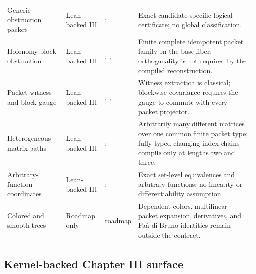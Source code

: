 \begin{longtable}{L{0.17\textwidth}L{0.18\textwidth}L{0.25\textwidth}L{0.22\textwidth}}
\addlinespace
Generic obstruction packet
& Lean-backed III
& ; 
& Exact candidate-specific logical certificate; no global classification.\\
\addlinespace
Holonomy block obstruction
& Lean-backed III
& ; ; 
& Finite complete idempotent packet family on the base fiber; orthogonality is not required by the compiled reconstruction.\\
\addlinespace
Packet witness and block gauge
& Lean-backed III
& ; ; 
& Witness extraction is classical; blockwise covariance requires the gauge to commute with every packet projector.\\
\addlinespace
Heterogeneous matrix paths
& Lean-backed III
& ; 
& Arbitrarily many different matrices over one common finite packet type; fully typed changing-index chains compile only at lengths two and three.\\
\addlinespace
Arbitrary-function coordinates
& Lean-backed III
& ; 
& Exact set-level equivalences and arbitrary functions; no linearity or differentiability assumption.\\
\addlinespace
Colored and smooth trees
& Roadmap only
& roadmap 
& Dependent colors, multilinear packet expansion, derivatives, and Fa\`a di Bruno identities remain outside the contract.\\
\bottomrule
\end{longtable}
\normalsize

\subsection{Kernel-backed Chapter III surface}

